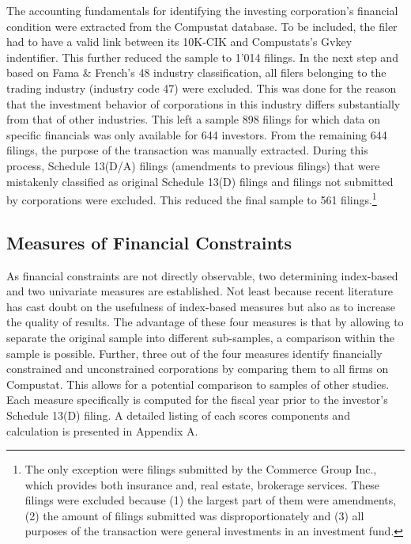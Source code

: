 \documentclass[12pt]{article}
\begin{document}
The accounting fundamentals for identifying the investing corporation's financial condition were extracted from the Compustat database. To be included, the filer had to have a valid link between its 10K-CIK and Compustats's Gvkey indentifier. This further reduced the sample to 1'014 filings. In the next step and based on Fama \& French's 48 industry classification, all filers belonging to the trading industry (industry code 47) were excluded. This was done for the reason that the investment behavior of corporations in this industry differs substantially from that of other industries. This left a sample 898 filings for which data on specific financials was only available for 644 investors. From the remaining 644 filings, the purpose of the transaction was manually extracted. During this process, Schedule 13(D/A) filings (amendments to previous filings) that were mistakenly classified as original Schedule 13(D) filings and filings not submitted by corporations were excluded. This reduced the final sample to 561 filings.\footnote{The only exception were filings submitted by the Commerce Group Inc., which provides both insurance and, real estate, brokerage services. These filings were excluded because (1) the largest part of them were amendments, (2) the amount of filings submitted was disproportionately and (3) all purposes of the transaction were general investments in an investment fund.} 

\subsection{Measures of Financial Constraints}

As financial constraints are not directly observable, two determining index-based and two univariate measures are established. Not least because recent literature has cast doubt on the usefulness \citep[p.109]{Khatami2014} of index-based measures but also as to increase the quality of results. The advantage of these four measures is that by allowing to separate the original sample into different sub-samples, a comparison within the sample is possible. Further, three out of the four measures identify financially constrained and unconstrained corporations by comparing them to all firms on Compustat. This allows for a potential comparison to samples of other studies. Each measure specifically is computed for the fiscal year prior to the investor's Schedule 13(D) filing. A detailed listing of each scores components and calculation is presented in Appendix A.\\
\end{document}
